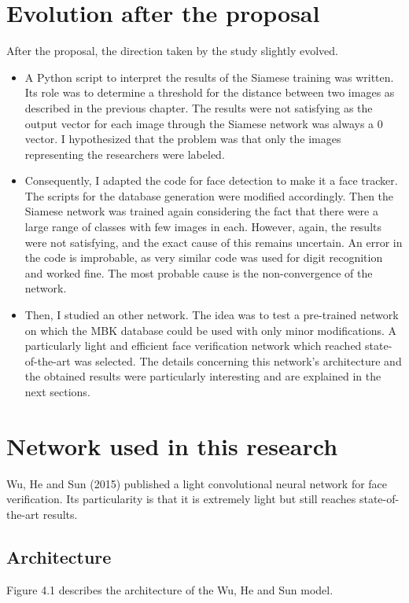 \section{Evolution after the proposal}
After the proposal, the direction taken by the study slightly evolved.
\begin{itemize}
\item A Python script to interpret the results of the Siamese training was written. Its role was to determine a threshold for the distance between two images as described in the previous chapter. The results were not satisfying as the output vector for each image through the Siamese network was always a 0 vector. I hypothesized that the problem was that only the images representing the researchers were labeled.
\item Consequently, I adapted the code for face detection to make it a face tracker. The scripts for the database generation were modified accordingly. Then the Siamese network was trained again considering the fact that there were a large range of classes with few images in each. However, again, the results were not satisfying, and the exact cause of this remains uncertain. An error in the code is improbable, as very similar code was used for digit recognition and worked fine. The most probable cause is the non-convergence of the network.
\item Then, I studied an other network. The idea was to test a pre-trained network on which the MBK database could be used with only minor modifications. A particularly light and efficient face verification network which reached state-of-the-art was selected. The details concerning this network's architecture and the obtained results were particularly interesting and are explained in the next sections.
\end{itemize}

\section{Network used in this research}

Wu, He and Sun (2015) published a light convolutional neural network for face verification. Its particularity is that it is extremely light but still reaches state-of-the-art results.

\subsection{Architecture}
Figure 4.1 describes the architecture of the Wu, He and Sun model.

